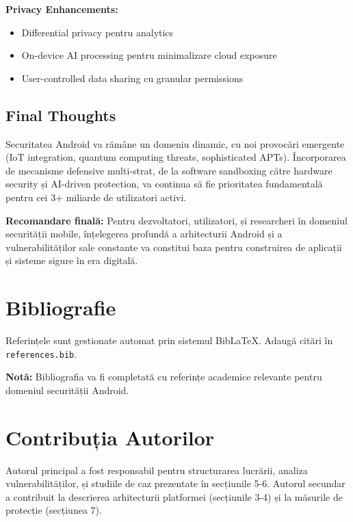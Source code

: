 \documentclass[11pt,a4paper,twocolumn]{article}
\theoremstyle{definition}
\theoremstyle{plain}
\theoremstyle{remark}
\begin{document}
\textbf{Privacy Enhancements:}
\begin{itemize}
    \item Differential privacy pentru analytics
    \item On-device AI processing pentru minimalizare cloud exposure
    \item User-controlled data sharing cu granular permissions
\end{itemize}

\subsection{Final Thoughts}

Securitatea Android va rămâne un domeniu dinamic, cu noi provocări emergente (IoT integration, 
quantum computing threats, sophisticated APTs). Încorporarea de mecanisme defensive multi-strat, 
de la software sandboxing către hardware security și AI-driven protection, va continua să fie 
prioritatea fundamentală pentru cei 3+ miliarde de utilizatori activi.

\textbf{Recomandare finală:} Pentru dezvoltatori, utilizatori, și researcheri în domeniul 
securității mobile, înțelegerea profundă a arhitecturii Android și a vulnerabilităților sale 
constante va constitui baza pentru construirea de aplicații și sisteme sigure în era digitală.

\section{Bibliografie}

Referințele sunt gestionate automat prin sistemul BibLaTeX. Adaugă citări în \texttt{references.bib}.

\bigskip
\noindent \textbf{Notă:} Bibliografia va fi completată cu referințe academice relevante pentru domeniul securității Android.

\section*{Contribuția Autorilor}

Autorul principal a fost responsabil pentru structurarea lucrării, analiza vulnerabilităților, 
și studiile de caz prezentate în secțiunile 5-6. Autorul secundar a contribuit la descrierea 
arhitecturii platformei (secțiunile 3-4) și la măsurile de protecție (secțiunea 7).
\end{document}
